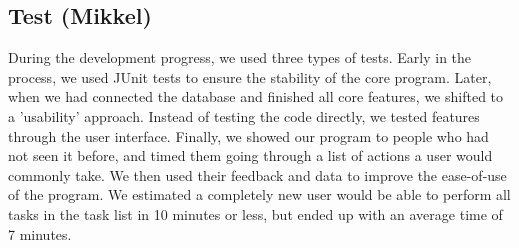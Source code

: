 \subsection{Test (Mikkel)}

During the development progress, we used three types of tests. Early in the process, we used JUnit tests to ensure the stability of the core program. Later, when we had connected the database and finished all core features, we shifted to a 'usability' approach. Instead of testing the code directly, we tested features through the user interface. Finally, we showed our program to people who had not seen it before, and timed them going through a list of actions a user would commonly take. We then used their feedback and data to improve the ease-of-use of the program. We estimated a completely new user would be able to perform all tasks in the task list in 10 minutes or less, but ended up with an average time of 7 minutes. 
